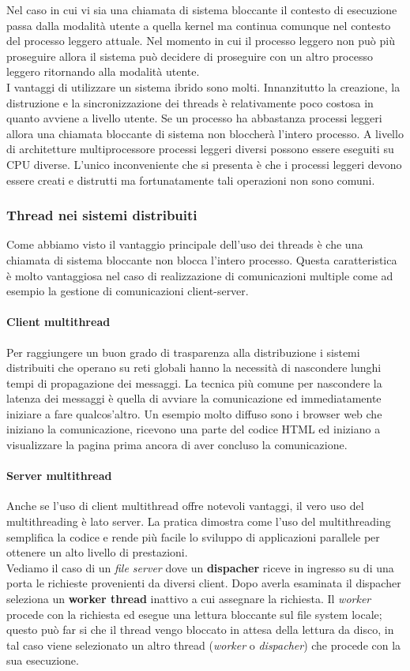 Nel caso in cui vi sia una chiamata di sistema bloccante il contesto di esecuzione passa dalla modalità utente a quella kernel ma continua comunque nel contesto del processo leggero attuale. Nel momento in cui il processo leggero non può più proseguire allora il sistema può decidere di proseguire con un altro processo leggero ritornando alla modalità utente.\\
I vantaggi di utilizzare un sistema ibrido sono molti. Innanzitutto la creazione, la distruzione e la sincronizzazione dei threads è relativamente poco costosa in quanto avviene a livello utente. Se un processo ha abbastanza processi leggeri allora una chiamata bloccante di sistema non bloccherà l'intero processo. A livello di architetture multiprocessore processi leggeri diversi possono essere eseguiti su CPU diverse.
L'unico inconveniente che si presenta è che i processi leggeri devono essere creati e distrutti ma fortunatamente tali operazioni non sono comuni.
\subsubsection{Thread nei sistemi distribuiti}
Come abbiamo visto il vantaggio principale dell'uso dei threads è che una chiamata di sistema bloccante non blocca l'intero processo. Questa caratteristica è molto vantaggiosa nel caso di realizzazione di comunicazioni multiple come ad esempio la gestione di comunicazioni client-server.
\paragraph{Client multithread}
Per raggiungere un buon grado di trasparenza alla distribuzione i sistemi distribuiti che operano su reti globali hanno la necessità di nascondere lunghi tempi di propagazione dei messaggi. La tecnica più comune per nascondere la latenza dei messaggi è quella di avviare la comunicazione ed immediatamente iniziare a fare qualcos'altro.
Un esempio molto diffuso sono i browser web che iniziano la comunicazione, ricevono una parte del codice HTML ed iniziano a visualizzare la pagina prima ancora di aver concluso la comunicazione.
\paragraph{Server multithread}
Anche se l'uso di client multithread offre notevoli vantaggi, il vero uso del multithreading è lato server. La pratica dimostra come l'uso del multithreading semplifica la codice e rende più facile lo sviluppo di applicazioni parallele per ottenere un alto livello di prestazioni.\\
Vediamo il caso di un \emph{file server} dove un \textbf{dispacher} riceve in ingresso su di una porta le richieste provenienti da diversi client. Dopo averla esaminata il dispacher seleziona un \textbf{worker thread} inattivo a cui assegnare la richiesta. Il \emph{worker} procede con la richiesta ed esegue una lettura bloccante sul file system locale; questo può far si che il thread vengo bloccato in attesa della lettura da disco, in tal caso viene selezionato un altro thread (\emph{worker} o \emph{dispacher}) che procede con la sua esecuzione.
